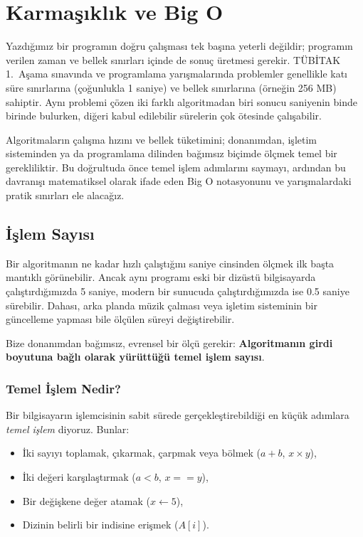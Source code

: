 \chapter[Karmaşıklık ve Big O · \textit{Temel}]{Karmaşıklık ve Big O}

Yazdığımız bir programın doğru çalışması tek başına yeterli değildir; programın verilen zaman ve bellek sınırları içinde de sonuç üretmesi gerekir. TÜBİTAK 1.~Aşama sınavında ve programlama yarışmalarında problemler genellikle katı süre sınırlarına (çoğunlukla 1 saniye) ve bellek sınırlarına (örneğin 256 MB) sahiptir. Aynı problemi çözen iki farklı algoritmadan biri sonucu saniyenin binde birinde bulurken, diğeri kabul edilebilir sürelerin çok ötesinde çalışabilir.

Algoritmaların çalışma hızını ve bellek tüketimini; donanımdan, işletim sisteminden ya da programlama dilinden bağımsız biçimde ölçmek temel bir gerekliliktir. Bu doğrultuda önce temel işlem adımlarını saymayı, ardından bu davranışı matematiksel olarak ifade eden Big O notasyonunu ve yarışmalardaki pratik sınırları ele alacağız.

\section{İşlem Sayısı}

Bir algoritmanın ne kadar hızlı çalıştığını saniye cinsinden ölçmek ilk başta mantıklı görünebilir. Ancak aynı programı eski bir dizüstü bilgisayarda çalıştırdığımızda 5 saniye, modern bir sunucuda çalıştırdığımızda ise 0.5 saniye sürebilir. Dahası, arka planda müzik çalması veya işletim sisteminin bir güncelleme yapması bile ölçülen süreyi değiştirebilir. 

Bize donanımdan bağımsız, evrensel bir ölçü gerekir: \textbf{Algoritmanın girdi boyutuna bağlı olarak yürüttüğü temel işlem sayısı}.

\subsection{Temel İşlem Nedir?}

Bir bilgisayarın işlemcisinin sabit sürede gerçekleştirebildiği en küçük adımlara \emph{temel işlem} diyoruz. Bunlar:
\begin{itemize}
    \item İki sayıyı toplamak, çıkarmak, çarpmak veya bölmek ($a + b$, $x \times y$),
    \item İki değeri karşılaştırmak ($a < b$, $x == y$),
    \item Bir değişkene değer atamak ($x \gets 5$),
    \item Dizinin belirli bir indisine erişmek ($A[i]$).
\end{itemize}

